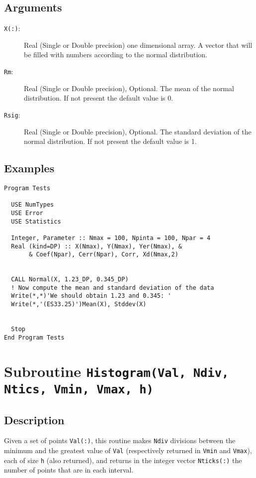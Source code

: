 \subsection{Arguments}

\begin{description}
\item[\texttt{X(:)}:] Real (Single or Double precision) one
  dimensional array. A vector that will be filled with numbers
  according to the normal distribution.
\item[\texttt{Rm}:] Real (Single or Double precision), Optional. The
  mean of the normal distribution. If not present the default value
  is 0.
\item[\texttt{Rsig}:] Real (Single or Double precision), Optional. The
  standard deviation of the normal distribution.  If not present the
  default value is 1. 
\end{description}

\subsection{Examples}

\begin{verbatim}
Program Tests

  USE NumTypes
  USE Error
  USE Statistics

  Integer, Parameter :: Nmax = 100, Npinta = 100, Npar = 4
  Real (kind=DP) :: X(Nmax), Y(Nmax), Yer(Nmax), &
       & Coef(Npar), Cerr(Npar), Corr, Xd(Nmax,2)


  CALL Normal(X, 1.23_DP, 0.345_DP)
  ! Now compute the mean and standard deviation of the data
  Write(*,*)'We should obtain 1.23 and 0.345: '
  Write(*,'(ES33.25)')Mean(X), Stddev(X)


  Stop
End Program Tests
\end{verbatim}

\section{Subroutine \texttt{Histogram(Val, Ndiv, Ntics, Vmin, Vmax,
    h)}} 

\subsection{Description}

Given a set of points \texttt{Val(:)}, this routine makes
\texttt{Ndiv} divisions between the minimum and the greatest value of
\texttt{Val} (respectively returned in \texttt{Vmin} and
\texttt{Vmax}), each of size \texttt{h} (also returned), and returns
in the integer vector \texttt{Nticks(:)} the number of points that are
in each interval. 

